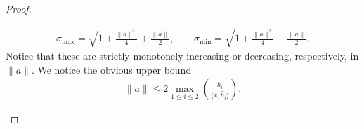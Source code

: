 \documentclass[10pt,letterpaper]{article}
\begin{document}
\begin{proof}
\begin{itemize}
        \begin{align*}
            \sigma_{\max} = \sqrt{ 1 + \frac{ \|a\|^{2} }{ 4 } } + \frac{ \|a\| }{2},
            \qquad 
            \sigma_{\min} = \sqrt{ 1 + \frac{ \|a\|^{2} }{ 4 } } - \frac{ \|a\| }{2}.     
        \end{align*}
        Notice that these are strictly monotonely increasing or decreasing, respectively, in $\|a\|$.
        We notice the obvious upper bound 
        \begin{align*}
            \|a\| 
            \leq 
            2 \max_{1 \leq i \leq 2} 
            \left( 
                \frac{ \hat h_i }{ \langle \hat x, \hat h_i \rangle } 
            \right)
            .
        \end{align*}


\end{itemize}
\end{proof}
\end{document}
